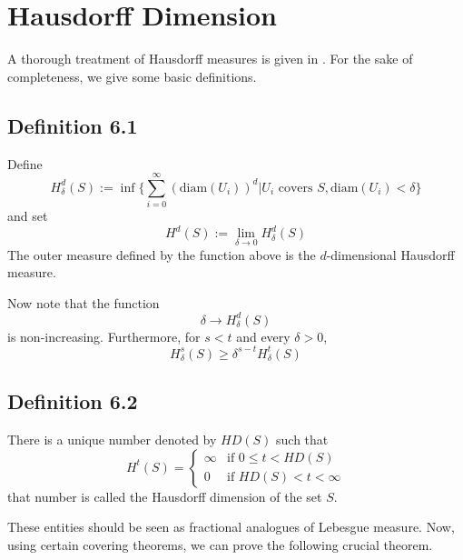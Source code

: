 \documentclass[11pt,a4paper]{article}
\begin{document}
\section{Hausdorff Dimension}
A thorough treatment of Hausdorff measures is given in
\cite{rogers1998hausdorff}. For the sake of completeness, we give some basic
definitions.

\subsection*{Definition 6.1}
    Define
    $$H_{\delta}^d(S) := \inf\Bigg\{\sum_{i = 0}^{\infty}(\text{diam}(U_i))^d  \Bigg|  U_i \text{ covers }S, \text{diam}(U_i) < \delta\Bigg\}$$
    and set
    $$H^d(S):= \lim_{\delta \rightarrow 0}H_{\delta}^d(S)$$
    The outer measure defined by the function above is the $d$-dimensional Hausdorff measure.


Now note that the function
$$\delta \rightarrow H_{\delta}^d(S)$$
is non-increasing. Furthermore, for $s<t$ and every $\delta>0$,
$$H_{\delta}^s(S) \geq \delta^{s-t}H_{\delta}^t(S)$$
\subsection*{Definition 6.2}
    There is a unique number denoted by $HD(S)$ such that
    \begin{equation*}
        H^t(S) = \begin{cases}
      \infty & \text{if } 0\leq t < HD(S) \\
      0        & \text{if } HD(S) < t <\infty
    \end{cases}
    \end{equation*}
    that number is called the Hausdorff dimension of the set $S$.


These entities should be seen as fractional analogues of Lebesgue measure.
Now, using certain covering theorems, we can prove the following crucial
theorem.

\end{document}
